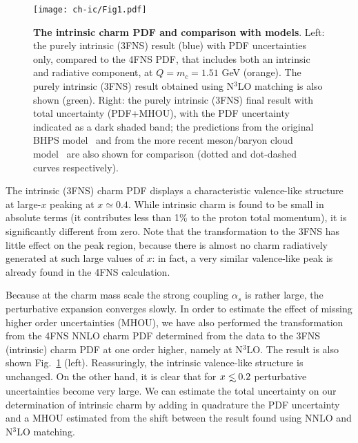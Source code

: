 \begin{figure}[h]
  \begin{center}
    \texttt{[image: ch-ic/Fig1.pdf]}
    \caption{\small  \textbf{ The intrinsic charm PDF
      and comparison with models}.
%
      Left: the purely
      intrinsic (3FNS) result (blue)
      with PDF uncertainties only, compared to the 4FNS PDF, that
      includes both an intrinsic and radiative
      component,   at
      $Q=m_c=1.51$ GeV (orange). The purely intrinsic (3FNS)
      result obtained using N$^3$LO matching is also shown (green).
      Right: the purely
      intrinsic (3FNS)
      final result with total uncertainty (PDF+MHOU), with the PDF
      uncertainty indicated as a dark shaded band;
the predictions from the original 
BHPS model~\cite{Brodsky:1980pb} and from the more recent meson/baryon
      cloud model~\cite{Hobbs:2013bia} are also shown for comparison
      (dotted and dot-dashed curves respectively).
         \label{fig:ic/charm_content_3fns} }
\end{center}
\end{figure}

The intrinsic (3FNS) charm PDF
displays a characteristic valence-like
 structure at large-$x$ peaking at $x\simeq 0.4$.
%
 While intrinsic charm is found to be small in absolute terms
 (it contributes less than 1\% to the proton  total momentum),
 it is significantly different from zero.
%
 Note that the transformation to the 3FNS has little effect on the peak region,
 because there is almost no charm radiatively generated at such large values of $x$: in
 fact, a very similar valence-like peak is already found in the 4FNS calculation.

Because at the charm mass scale the strong coupling $\alpha_s$ is rather
large, the perturbative expansion converges slowly.
%
In order to
estimate the effect of missing higher order uncertainties (MHOU), we
have also performed the transformation from the 4FNS NNLO charm PDF
determined from the data to the 3FNS (intrinsic) charm PDF at one
order higher, namely at N$^3$LO. 
%
The result is also shown
Fig.~\ref{fig:ic/charm_content_3fns} (left). Reassuringly, the intrinsic
valence-like structure is unchanged.
%
On the other hand, it is clear that for
$x\lsim 0.2$ perturbative uncertainties become very large.
%
We can estimate  the total uncertainty on our determination
of intrinsic charm by adding in quadrature the PDF uncertainty and a
MHOU estimated from the shift between the result found using NNLO
and N$^3$LO matching.

